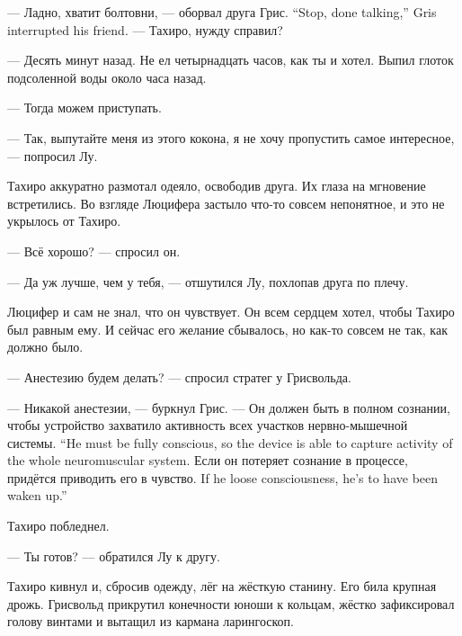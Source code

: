 {--- Ладно, хватит болтовни, --- оборвал друга Грис.}
{``Stop, done talking,'' Gris interrupted his friend.}
--- Тахиро, нужду справил?

--- Десять минут назад.
Не ел четырнадцать часов, как ты и хотел.
Выпил глоток подсоленной воды около часа назад.

--- Тогда можем приступать.

--- Так, выпутайте меня из этого кокона, я не хочу пропустить самое интересное, --- попросил Лу.

Тахиро аккуратно размотал одеяло, освободив друга.
Их глаза на мгновение встретились.
Во взгляде Люцифера застыло что-то совсем непонятное, и это не укрылось от Тахиро.

--- Всё хорошо? --- спросил он.

--- Да уж лучше, чем у тебя, --- отшутился Лу, похлопав друга по плечу.

Люцифер и сам не знал, что он чувствует.
Он всем сердцем хотел, чтобы Тахиро был равным ему.
И сейчас его желание сбывалось, но как-то совсем не так, как должно было.

--- Анестезию будем делать? --- спросил стратег у Грисвольда.

--- Никакой анестезии, --- буркнул Грис.
{--- Он должен быть в полном сознании, чтобы устройство захватило активность всех участков нервно-мышечной системы.}
{``He must be fully conscious, so the device is able to capture activity of the whole neuromuscular system.}
{Если он потеряет сознание в процессе, придётся приводить его в чувство.}
{If he loose consciousness, he's to have been waken up.''}

Тахиро побледнел.

--- Ты готов? --- обратился Лу к другу.

Тахиро кивнул и, сбросив одежду, лёг на жёсткую станину.
Его била крупная дрожь.
Грисвольд прикрутил конечности юноши к кольцам, жёстко зафиксировал голову винтами и вытащил из кармана ларингоскоп.

